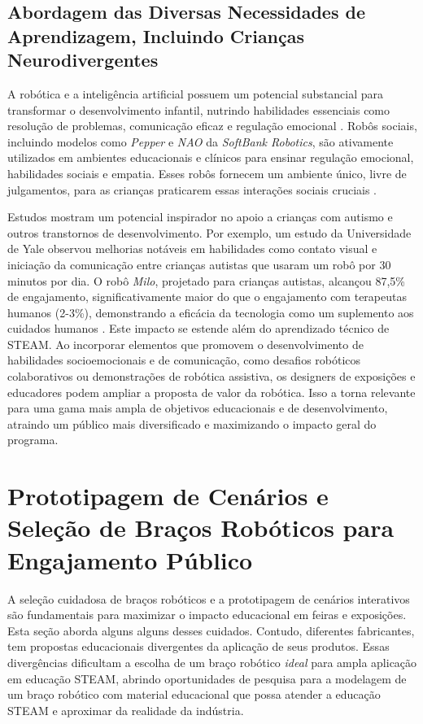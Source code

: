 \documentclass[%
  a4paper,%
  12pt,%
  fleqn,%
  english,%
  brazilian,%
]{article}
\begin{document}
\subsection{Abordagem das Diversas Necessidades de Aprendizagem, Incluindo Crianças Neurodivergentes}
\label{sec:neurodivergentes}
A robótica e a inteligência artificial possuem um potencial substancial para transformar o desenvolvimento infantil, nutrindo habilidades essenciais como resolução de problemas, comunicação eficaz e regulação emocional \cite{behavioralHealthRoboticsAI2025}. Robôs sociais, incluindo modelos como \emph{Pepper} e \emph{NAO} da \textit{SoftBank Robotics}, são ativamente utilizados em ambientes educacionais e clínicos para ensinar regulação emocional, habilidades sociais e empatia. Esses robôs fornecem um ambiente único, livre de julgamentos, para as crianças praticarem essas interações sociais cruciais \cite{behavioralHealthRoboticsAI2025}.

Estudos mostram um potencial inspirador no apoio a crianças com autismo e outros transtornos de desenvolvimento. Por exemplo, um estudo da Universidade de Yale observou melhorias notáveis em habilidades como contato visual e iniciação da comunicação entre crianças autistas que usaram um robô por 30 minutos por dia. O robô \emph{Milo}, projetado para crianças autistas, alcançou 87,5\% de engajamento, significativamente maior do que o engajamento com terapeutas humanos (2-3\%), demonstrando a eficácia da tecnologia como um suplemento aos cuidados humanos \cite{behavioralHealthRoboticsAI2025}. Este impacto se estende além do aprendizado técnico de STEAM. Ao incorporar elementos que promovem o desenvolvimento de habilidades socioemocionais e de comunicação, como desafios robóticos colaborativos ou demonstrações de robótica assistiva, os designers de exposições e educadores podem ampliar a proposta de valor da robótica. Isso a torna relevante para uma gama mais ampla de objetivos educacionais e de desenvolvimento, atraindo um público mais diversificado e maximizando o impacto geral do programa.

\section{Prototipagem de Cenários e Seleção de Braços Robóticos para Engajamento Público}
A seleção cuidadosa de braços robóticos e a prototipagem de cenários interativos são fundamentais para maximizar o impacto educacional em feiras e exposições. Esta seção aborda alguns alguns desses cuidados. Contudo, diferentes fabricantes, tem propostas educacionais divergentes da aplicação de seus produtos. Essas divergências dificultam a escolha de um braço robótico \emph{ideal} para ampla aplicação em educação STEAM, abrindo oportunidades de pesquisa para a modelagem de um braço robótico com material educacional que possa atender a educação STEAM e aproximar da realidade da indústria.
\end{document}
